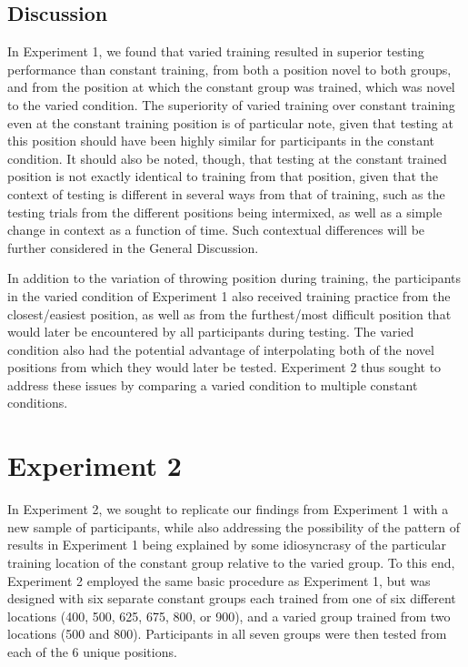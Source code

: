 \documentclass[
  12pt,
  letterpaper,
]{article}
\begin{document}
\subsection{Discussion}\label{discussion}

In Experiment 1, we found that varied training resulted in superior
testing performance than constant training, from both a position novel
to both groups, and from the position at which the constant group was
trained, which was novel to the varied condition. The superiority of
varied training over constant training even at the constant training
position is of particular note, given that testing at this position
should have been highly similar for participants in the constant
condition. It should also be noted, though, that testing at the constant
trained position is not exactly identical to training from that
position, given that the context of testing is different in several ways
from that of training, such as the testing trials from the different
positions being intermixed, as well as a simple change in context as a
function of time. Such contextual differences will be further considered
in the General Discussion.

In addition to the variation of throwing position during training, the
participants in the varied condition of Experiment 1 also received
training practice from the closest/easiest position, as well as from the
furthest/most difficult position that would later be encountered by all
participants during testing. The varied condition also had the potential
advantage of interpolating both of the novel positions from which they
would later be tested. Experiment 2 thus sought to address these issues
by comparing a varied condition to multiple constant conditions.

\section{Experiment 2}\label{experiment-2}

In Experiment 2, we sought to replicate our findings from Experiment 1
with a new sample of participants, while also addressing the possibility
of the pattern of results in Experiment 1 being explained by some
idiosyncrasy of the particular training location of the constant group
relative to the varied group. To this end, Experiment 2 employed the
same basic procedure as Experiment 1, but was designed with six separate
constant groups each trained from one of six different locations (400,
500, 625, 675, 800, or 900), and a varied group trained from two
locations (500 and 800). Participants in all seven groups were then
tested from each of the 6 unique positions.
\end{document}
